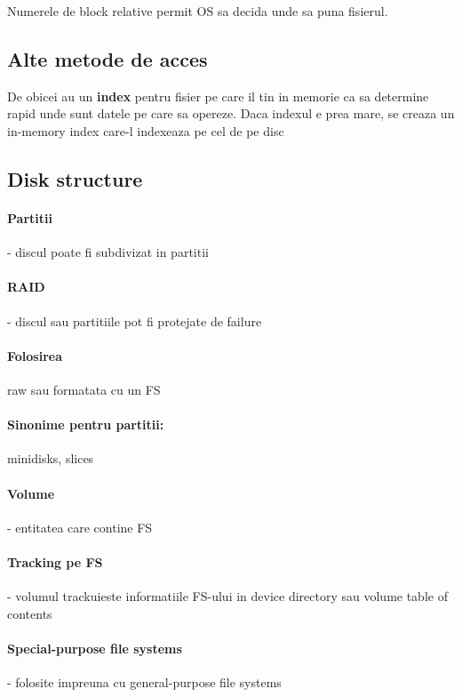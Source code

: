 \documentclass{article}
\begin{document}
Numerele de block relative permit OS sa decida unde sa puna fisierul.

\subsection*{Alte metode de acces}
De obicei au un \textbf{index} pentru fisier pe care il tin in memorie ca sa determine rapid unde sunt datele pe care sa opereze. Daca indexul e prea mare, se creaza un in-memory index care-l indexeaza pe cel de pe disc

\subsection*{Disk structure}
\paragraph*{Partitii} - discul poate fi subdivizat in partitii
\paragraph*{RAID} - discul sau partitiile pot fi protejate de failure
\paragraph*{Folosirea} raw sau formatata cu un FS
\paragraph*{Sinonime pentru partitii:} minidisks, slices
\paragraph*{Volume} - entitatea care contine FS
\paragraph*{Tracking pe FS} - volumul trackuieste informatiile FS-ului in device directory sau volume table of contents
\paragraph*{Special-purpose file systems} - folosite impreuna cu general-purpose file systems
\end{document}
